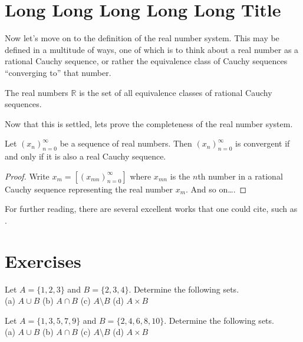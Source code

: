 \documentclass[11pt]{linearbook}
\begin{document}
\section{Long Long Long Long Long Title}

Now let's move on to the definition of the real number system. This
may be defined in a multitude of ways, one of which is to think about
a real number as a rational Cauchy sequence, or rather the equivalence
class of Cauchy sequences ``converging to'' that number.

\begin{definition}
  \label{def:realnumbers}
  The real numbers $\mathbb{R}$ is the set of all equivalence classes
  of rational Cauchy sequences.
\end{definition}

Now that this is settled, lets prove the completeness of the real
number system.

\begin{theorem}
  \label{th:realnumberscomplete}
  Let $(x_n)_{n=0}^{\infty}$ be a sequence of real numbers.
  Then $(x_n)_{n=0}^{\infty}$ is convergent if and only if
  it is also a real Cauchy sequence.
  \end{theorem}
\begin{proof}
  Write $x_m = [(x_{mn})_{n=0}^{\infty}]$ where
  $x_{mn}$ is the $n$th number in a rational Cauchy sequence
  representing the real number $x_m$. And so on\ldots.
\end{proof}

For further reading, there are several excellent works that one could
cite, such as \parencite{Tao2006,Turing1936}.

\section*{Exercises}

\begin{exercise}
  Let $A = \{1, 2, 3\}$ and $B = \{2, 3, 4\}$.
  Determine the following sets. \\
  (a) $A \cup B$ \quad
  (b) $A \cap B$ \quad
  (c) $A \setminus B$ \quad
  (d) $A \times B$
\end{exercise}

\begin{exercise}
  Let $A = \{1, 3, 5, 7, 9\}$ and $B = \{2, 4, 6, 8, 10\}$.
  Determine the following sets. \\
  (a) $A \cup B$ \quad
  (b) $A \cap B$ \quad
  (c) $A \setminus B$ \quad
  (d) $A \times B$
\end{exercise}
\end{document}
